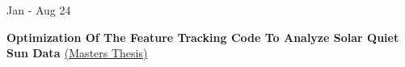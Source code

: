 \begin{onecolentry}
\begin{highlights}

                
            \end{highlights}        
        \end{onecolentry}
        
        \vspace{0.2 cm}
        \begin{twocolentry}
            {Jan - Aug 24}
            
            \textbf{Optimization Of The Feature Tracking Code To Analyze Solar Quiet Sun Data \href{https://drive.google.com/file/d/177hjcXcHCzlMHXnNjdPv3_OTtgu7IE0A/view?usp=sharing}{\faExternalLink}}{\href{https://drive.google.com/file/d/1XAY01jkwndByMHBNCZhTZ_OLq4SwbaKe/view?usp=sharing}{(Masters Thesis)}}    
            
        \end{twocolentry}
        \vspace{0.10 cm}
